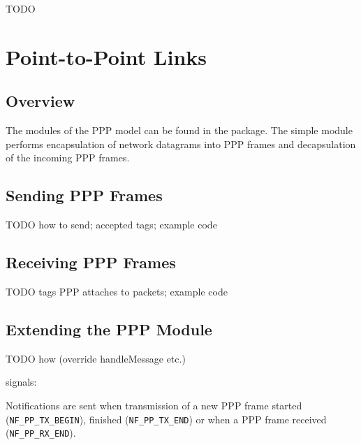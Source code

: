 \ifdraft TODO

\chapter{Point-to-Point Links}
\label{cha:ppp}


\section{Overview}

The modules of the PPP model can be found in the 
package. The  simple module performs encapsulation
of network datagrams into PPP frames and decapsulation of
the incoming PPP frames.

\section{Sending PPP Frames}

TODO how to send; accepted tags; example code

\section{Receiving PPP Frames}

TODO tags PPP attaches to packets; example code

\section{Extending the PPP Module}

TODO how (override handleMessage etc.)

signals:

Notifications are sent when
transmission of a new PPP frame started (\verb!NF_PP_TX_BEGIN!), finished
(\verb!NF_PP_TX_END!) or when a PPP frame received (\verb!NF_PP_RX_END!).

\fi



